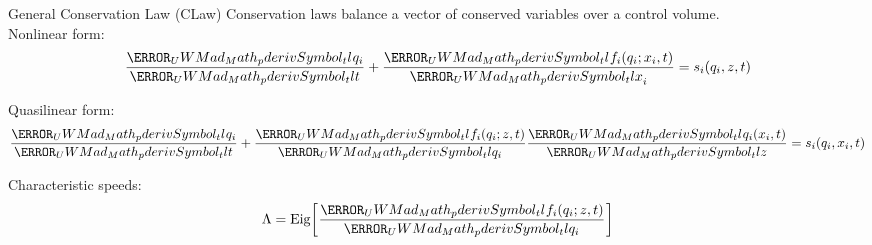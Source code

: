 \documentclass[10pt,t,xcolor=table,compress]{UWMadBeamer}
\begin{document}
    \begin{frame}{General Conservation Law (CLaw)}
        Conservation laws balance a vector of conserved variables \qCon over a control volume.\\[2em]
        
        Nonlinear form:
        \begin{equation}
            \pderiv{q_i}{t} + \pderiv{f_i(q_i; x_i,t)}{x_i}= s_i(q_i,z,t)
            \label{Eqn:GeneralCLaw}
        \end{equation}
        
        Quasilinear form:
        \begin{equation}
            \pderiv{q_i}{t} + \pderiv{f_i(q_i;z,t)}{q_i{}}\pderiv{q_i(x_i,t)}{z} = s_i(q_i,x_i,t)
            \label{Eqn:GeneralCLawQuasilinear}
        \end{equation}
        
        Characteristic speeds:
        \begin{equation}
            \Lambda = \mbox{Eig}\left[\pderiv{f_i(q_i;z,t)}{q_i{}}\right]\label{Eqn:GeneralSpeeds}
        \end{equation}
    \end{frame}





\end{document}
